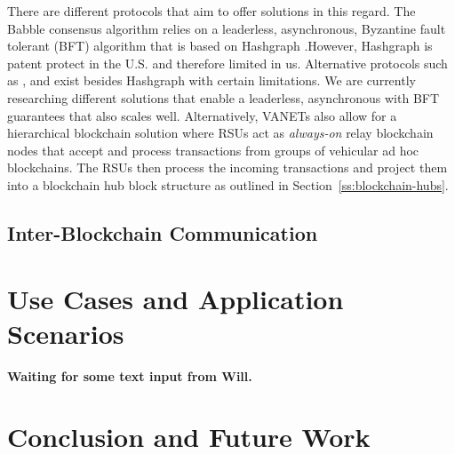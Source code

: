 \documentclass{llncs}
\begin{document}
{			There are different protocols that aim to offer solutions in this regard. The Babble consensus algorithm \cite{bibid} relies on a leaderless, asynchronous, Byzantine fault tolerant (BFT) algorithm that is based on Hashgraph \cite{bibid}.However, Hashgraph is patent protect in the U.S. and therefore limited in us. Alternative protocols such as \cite{miller2016honey}, \cite{bibid} and \cite{bibid} exist besides Hashgraph with certain limitations. We are currently researching different solutions that enable a leaderless, asynchronous with BFT guarantees that also scales well. Alternatively, VANETs also allow for a hierarchical blockchain solution where RSUs act as \textit{always-on} relay blockchain nodes that accept and process transactions from groups of vehicular ad hoc blockchains. The RSUs then process the incoming transactions and project them into a blockchain hub block structure as outlined in Section~\ref{ss:blockchain-hubs}.
		
				
		\subsection{Inter-Blockchain Communication}
			\label{ss:inter-blockchain-communication}
			

	
	\section{Use Cases and Application Scenarios}
		\label{s:section-5}	
	
		
		\textbf{Waiting for some text input from Will.}
	

	\section{Conclusion and Future Work}
		\label{s:section-6}	


}
\end{document}
